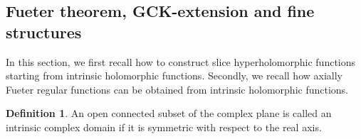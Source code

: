 \documentclass[reqno,11pt]{amsart}
\numberwithin{equation}{section}
\theoremstyle{definition}
\newtheorem{definition}[theorem]{Definition}
\begin{document}

\subsection{Fueter theorem, GCK-extension and fine structures}

In this section, we first recall how to construct slice hyperholomorphic functions starting from intrinsic holomorphic functions. Secondly, we recall how axially Fueter regular functions can be obtained from intrinsic holomorphic functions.

\begin{definition}
	An open connected subset of the complex plane is called an intrinsic complex domain if it is symmetric with respect to the real axis.
\end{definition}
\end{document}
